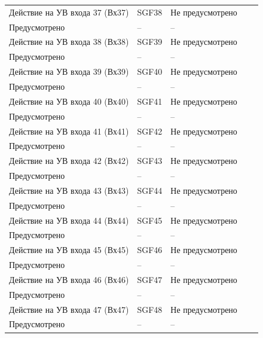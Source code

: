 \begin{longtable}{|>{\centering\arraybackslash}m{5.3cm}|>{\centering\arraybackslash}m{3.3cm}|>{\centering\arraybackslash}m{4.2cm}|>{\centering\arraybackslash}m{1.8cm}|>{\centering\arraybackslash}m{1cm}|}
\hline
\centering Действие на УВ входа 37 (Вх37)  & \centering SGF38 & \centering Не предусмотрено \\ Предусмотрено & \centering -- & \centering \arraybackslash -- \\
\hline
\centering Действие на УВ входа 38 (Вх38)  & \centering SGF39 & \centering Не предусмотрено \\ Предусмотрено & \centering -- & \centering \arraybackslash -- \\
\hline
\centering Действие на УВ входа 39 (Вх39)  & \centering SGF40 & \centering Не предусмотрено \\ Предусмотрено & \centering -- & \centering \arraybackslash -- \\
\hline
\centering Действие на УВ входа 40 (Вх40)  & \centering SGF41 & \centering Не предусмотрено \\ Предусмотрено & \centering -- & \centering \arraybackslash -- \\
\hline
\centering Действие на УВ входа 41 (Вх41)  & \centering SGF42 & \centering Не предусмотрено \\ Предусмотрено & \centering -- & \centering \arraybackslash -- \\
\hline
\centering Действие на УВ входа 42 (Вх42)  & \centering SGF43 & \centering Не предусмотрено \\ Предусмотрено & \centering -- & \centering \arraybackslash -- \\
\hline
\centering Действие на УВ входа 43 (Вх43)  & \centering SGF44 & \centering Не предусмотрено \\ Предусмотрено & \centering -- & \centering \arraybackslash -- \\
\hline
\centering Действие на УВ входа 44 (Вх44)  & \centering SGF45 & \centering Не предусмотрено \\ Предусмотрено & \centering -- & \centering \arraybackslash -- \\
\hline
\centering Действие на УВ входа 45 (Вх45)  & \centering SGF46 & \centering Не предусмотрено \\ Предусмотрено & \centering -- & \centering \arraybackslash -- \\
\hline
\centering Действие на УВ входа 46 (Вх46)  & \centering SGF47 & \centering Не предусмотрено \\ Предусмотрено & \centering -- & \centering \arraybackslash -- \\
\hline
\centering Действие на УВ входа 47 (Вх47)  & \centering SGF48 & \centering Не предусмотрено \\ Предусмотрено & \centering -- & \centering \arraybackslash -- \\

\end{longtable}
